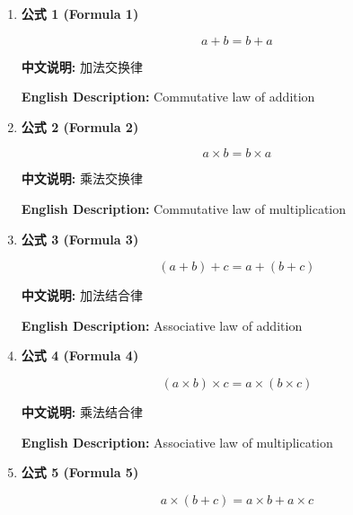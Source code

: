 \documentclass[12pt,a4paper]{article}
\begin{document}
\begin{enumerate}[leftmargin=*]

\item \textbf{公式 1 (Formula 1)}

\begin{equation}
a + b = b + a
\end{equation}

\textbf{中文说明:} 加法交换律

\textbf{English Description:} Commutative law of addition

\vspace{0.5cm}

\item \textbf{公式 2 (Formula 2)}

\begin{equation}
a \times b = b \times a
\end{equation}

\textbf{中文说明:} 乘法交换律

\textbf{English Description:} Commutative law of multiplication

\vspace{0.5cm}

\item \textbf{公式 3 (Formula 3)}

\begin{equation}
(a + b) + c = a + (b + c)
\end{equation}

\textbf{中文说明:} 加法结合律

\textbf{English Description:} Associative law of addition

\vspace{0.5cm}

\item \textbf{公式 4 (Formula 4)}

\begin{equation}
(a \times b) \times c = a \times (b \times c)
\end{equation}

\textbf{中文说明:} 乘法结合律

\textbf{English Description:} Associative law of multiplication

\vspace{0.5cm}

\item \textbf{公式 5 (Formula 5)}

\begin{equation}
a \times (b + c) = a \times b + a \times c
\end{equation}


\end{enumerate}
\end{document}
